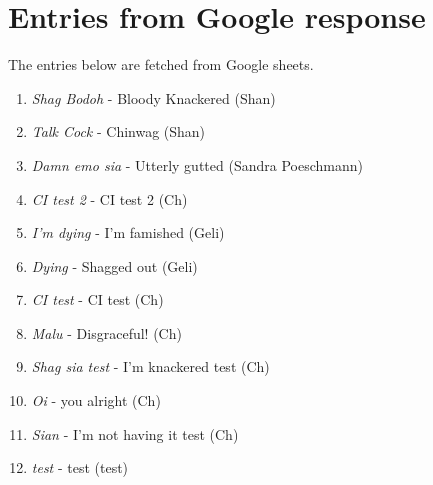 \chapter{Entries from Google response}

The entries below are fetched from Google sheets.
\begin{enumerate}
\item \textit{Shag Bodoh} - Bloody Knackered (Shan)
\item \textit{Talk Cock} - Chinwag (Shan)
\item \textit{Damn emo sia} - Utterly gutted (Sandra Poeschmann)
\item \textit{CI test 2} - CI test 2 (Ch)
\item \textit{I’m dying} - I’m famished (Geli)
\item \textit{Dying} - Shagged out (Geli)
\item \textit{CI test} - CI test (Ch)
\item \textit{Malu} - Disgraceful! (Ch)
\item \textit{Shag sia test} - I'm knackered test (Ch)
\item \textit{Oi} - you alright (Ch)
\item \textit{Sian} - I'm not having it test (Ch)
\item \textit{test} - test (test)
\end{enumerate}
